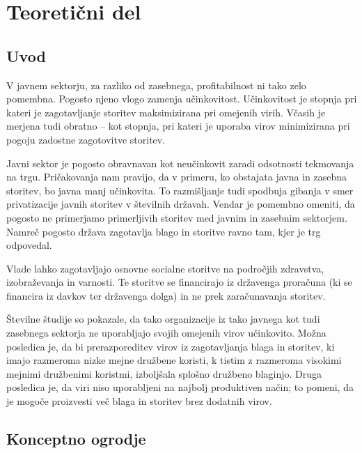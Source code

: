 \documentclass[12pt,a4paper]{article}
\theoremstyle{definition}
\begin{document}
\setlength{\parskip}{1em}
\setlength{\parindent}{0pt}

\tableofcontents

\section{Teoretični del}

\subsection{Uvod}

V javnem sektorju, za razliko od zasebnega, profitabilnost
ni tako zelo pomembna. Pogosto njeno vlogo zamenja učinkovitost. 
Učinkovitost je stopnja pri kateri je zagotavljanje storitev maksimizirana pri omejenih 
virih. Včasih je merjena tudi obratno -- kot stopnja, pri kateri je uporaba virov 
minimizirana pri pogoju zadostne zagotovitve storitev. 

Javni sektor je pogosto obravnavan kot neučinkovit zaradi odsotnosti
tekmovanja na trgu. Pričakovanja nam pravijo, da v primeru, ko obstajata
javna in zasebna storitev, bo javna manj učinkovita. To razmišljanje tudi
spodbuja gibanja v smer privatizacije javnih storitev v številnih državah.
Vendar je pomembno omeniti, da pogosto ne primerjamo primerljivih
storitev med javnim in zasebnim sektorjem. Namreč 
pogosto država zagotavlja blago in storitve ravno tam, kjer je trg odpovedal.
\cite{Lovell2002}

Vlade lahko zagotavljajo osnovne socialne storitve na področjih
zdravstva, izobraževanja in varnosti. Te storitve se financirajo
iz državenga proračuna (ki se financira iz davkov ter državenga
dolga) in ne prek zaračunavanja storitev. 

Številne študije so pokazale, da tako organizacije iz tako javnega
kot tudi zasebnega sektorja ne uporabljajo svojih omejenih virov
učinkovito. Možna posledica je, da bi prerazporeditev virov iz
zagotavljanja blaga in storitev, ki imajo razmeroma nizke
mejne družbene koristi, k tistim z razmeroma visokimi mejnimi
družbenimi koristmi, izboljšala splošno družbeno blaginjo.
Druga posledica je, da viri niso uporabljeni na najbolj 
produktiven način; to pomeni, da je mogoče proizvesti več
blaga in storitev brez dodatnih virov. \cite{Yaisawarng2002}

\subsection{Konceptno ogrodje}
\end{document}
